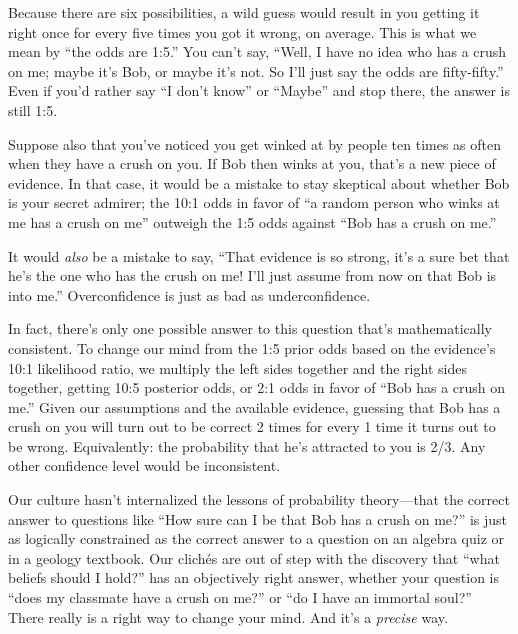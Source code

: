 {
 Because there are six possibilities, a wild guess would result in
you getting it right once for every five times you got it wrong, on
average. This is what we mean by ``the odds are
1:5.'' You can't say,
``Well, I have no idea who has a crush on me; maybe
it's Bob, or maybe it's not. So
I'll just say the odds are
fifty-fifty.'' Even if you'd rather
say ``I don't know''
or ``Maybe'' and stop there, the
answer is still 1:5.}

{
 Suppose also that you've noticed you get winked at
by people ten times as often when they have a crush on you. If Bob then
winks at you, that's a new piece of evidence. In that
case, it would be a mistake to stay skeptical about whether Bob is your
secret admirer; the 10:1 odds in favor of ``a random
person who winks at me has a crush on me'' outweigh
the 1:5 odds against ``Bob has a crush on
me.''}

{
 It would \textit{also} be a mistake to say,
``That evidence is so strong, it's a
sure bet that he's the one who has the crush on me!
I'll just assume from now on that Bob is into
me.'' Overconfidence is just as bad as
underconfidence.}

{
 In fact, there's only one possible answer to this
question that's mathematically consistent. To change
our mind from the 1:5 prior odds based on the
evidence's 10:1 likelihood ratio, we multiply the left
sides together and the right sides together, getting 10:5 posterior
odds, or 2:1 odds in favor of ``Bob has a crush on
me.'' Given our assumptions and the available
evidence, guessing that Bob has a crush on you will turn out to be
correct 2 times for every 1 time it turns out to be wrong.
Equivalently: the probability that he's attracted to
you is 2/3. Any other confidence level would be inconsistent.}

{
 Our culture hasn't internalized the lessons of
probability theory---that the correct answer to questions like
``How sure can I be that Bob has a crush on
me?'' is just as logically constrained as the correct
answer to a question on an algebra quiz or in a geology textbook. Our
clichés are out of step with the discovery that ``what
beliefs should I hold?'' has an objectively right
answer, whether your question is ``does my classmate
have a crush on me?'' or ``do I have
an immortal soul?'' There really is a right way to
change your mind. And it's a \textit{precise} way.}

